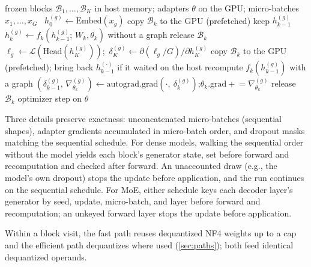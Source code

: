 \documentclass[11pt,letterpaper]{article}
\theoremstyle{definition}
\theoremstyle{plain}
\newcommand{\G}{G}
\begin{document}
\begin{algorithm}[t]
\caption{One optimizer step under block-major accumulation (the last block,
which stays resident between the passes, is not shown separately).}
\label{alg:blockmajor}
\small
\begin{algorithmic}[1]
\Require frozen blocks $\mathcal{B}_1,\dots,\mathcal{B}_K$ in host memory; adapters $\theta$ on the GPU; micro-batches $x_1,\dots,x_\G$
\For{$g=1,\dots,\G$}\ $h^{(g)}_0 \gets \mathrm{Embed}(x_g)$\EndFor
{}
  \State copy $\mathcal{B}_k$ to the GPU (prefetched)
  \For{$g=1,\dots,\G$}
    \State keep $h^{(g)}_{k-1}$ 
    \State $h^{(g)}_k \gets f_k(h^{(g)}_{k-1};\,W_k,\theta_k)$ without a graph
  \EndFor
  \State release $\mathcal{B}_k$
\EndFor
\For{$g=1,\dots,\G$}\ $\ell_g \gets \mathcal{L}(\mathrm{Head}(h^{(g)}_K))$;\ $\delta^{(g)}_K \gets \partial(\ell_g/\G)/\partial h^{(g)}_K$\EndFor
{}
  \State copy $\mathcal{B}_k$ to the GPU (prefetched); bring back $h^{(\cdot)}_{k-1}$ if it waited on the host
  \For{$g=1,\dots,\G$}
    \State recompute $f_k(h^{(g)}_{k-1})$ with a graph
    \State $(\delta^{(g)}_{k-1},\,\nabla^{(g)}_{\theta_k}) \gets \mathrm{autograd.grad}(\cdot,\ \delta^{(g)}_k)$;\quad $\theta_k.\mathrm{grad} \mathrel{+}= \nabla^{(g)}_{\theta_k}$
  \EndFor
  \State release $\mathcal{B}_k$
\EndFor
\State optimizer step on $\theta$
\end{algorithmic}
\end{algorithm}

Three details preserve exactness: unconcatenated micro-batches (sequential shapes), adapter gradients accumulated in micro-batch order, and dropout masks matching the sequential schedule. For dense models, walking the sequential order without the model yields each block's generator state, set before forward and recomputation and checked after forward. An unaccounted draw (e.g., the model's own dropout) stops the update before application, and the run continues on the sequential schedule. For MoE, either schedule keys each decoder layer's generator by seed, update, micro-batch, and layer before forward and recomputation; an unkeyed forward layer stops the update before application.

Within a block visit, the fast path reuses dequantized NF4 weights up to a cap and the efficient path dequantizes where used (\cref{sec:paths}); both feed identical dequantized operands.
\end{document}
